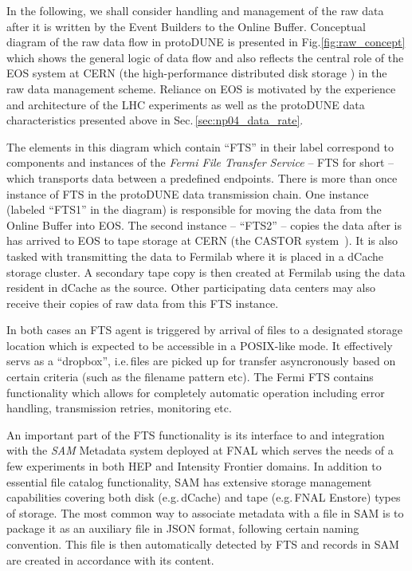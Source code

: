 \documentclass[a4paper]{jpconf}
\newcommand{\pd}{protoDUNE\xspace}
\begin{document}
In the following, we shall consider handling and management of the raw data after it is
written by the Event Builders to the Online Buffer.  Conceptual diagram of the raw data
flow in \pd is presented in Fig.\ref{fig:raw_concept} which shows the general logic of data flow
and also reflects the central role of the EOS system at CERN (the high-performance distributed
disk storage \cite{eos}) in the raw data management scheme.
Reliance on EOS is motivated by the experience and architecture of the LHC experiments
as well as the \pd data characteristics presented above in Sec.\,\ref{sec:np04_data_rate}.

The elements in this diagram which contain ``FTS'' in their label correspond to components and
instances of the \textit{Fermi File Transfer Service} -- FTS for short \cite{fts} -- which transports
data between a predefined endpoints.
There is more than once instance of FTS in the \pd data transmission chain. One instance (labeled ``FTS1''
in the diagram) is responsible for moving the data from the Online Buffer into EOS. The second instance
-- ``FTS2'' --  copies the data after is has arrived to EOS to tape storage at CERN (the CASTOR
system~\cite{castor}). It is also tasked with transmitting the data to Fermilab 
where it is placed
in a dCache~\cite{dcache} storage cluster. A secondary tape copy is then created at Fermilab
using the data resident in dCache as the source. Other participating data centers may also
receive their copies of raw data from this FTS instance.

In both cases an FTS agent is triggered by arrival of files to a designated
storage location which is expected to be accessible in a POSIX-like  mode.
It effectively servs as a ``dropbox'', i.e.\,files are picked up
for transfer asyncronously based on certain criteria (such as the filename pattern etc).
The Fermi FTS contains functionality which allows for completely automatic operation
including error handling, transmission retries, monitoring etc.

An important part of the FTS functionality is its interface to and integration with 
the \textit{SAM} Metadata system deployed at FNAL which serves the needs of a few
experiments in both HEP and Intensity Frontier domains. In addition to essential file catalog
functionality, SAM has extensive storage management
capabilities covering both disk (e.g.\,dCache) and tape (e.g.\,FNAL Enstore) types of storage.
The most common way
to associate metadata with a file in SAM is to package it as an auxiliary file in JSON format,
following certain naming convention. This file is then automatically detected by FTS
and records in SAM are created in accordance with its content.
\end{document}
